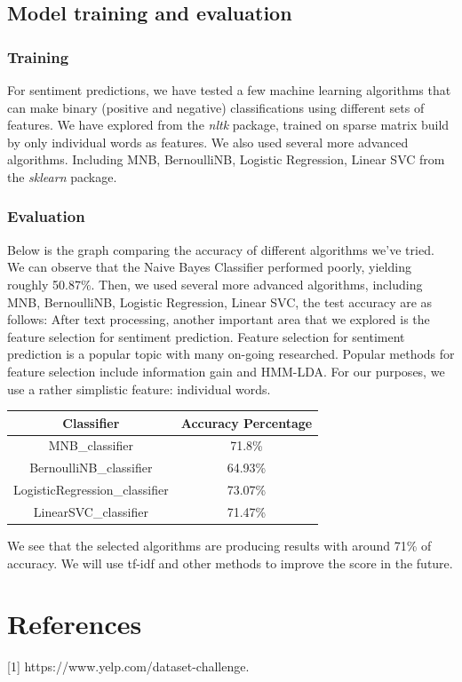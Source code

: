 \documentclass{article}
\begin{document}
\subsection{Model training and evaluation}
\subsubsection{Training}
For sentiment predictions, we have tested a few machine learning algorithms that can make binary (positive and negative) classifications using different sets of features. We have explored from the \textit{nltk} package, trained on sparse matrix build by only individual words as features. We also used several more advanced algorithms. Including MNB, BernoulliNB, Logistic Regression, Linear SVC from the \textit{sklearn} package.

\subsubsection{Evaluation}
Below is the graph comparing the accuracy of different algorithms we've tried.   
We can observe that the Naive Bayes Classifier performed poorly, yielding roughly 50.87\%. 
Then, we used several more advanced algorithms, including MNB, BernoulliNB, Logistic Regression, Linear SVC, the test accuracy are as follows: After text processing, another important area that we explored is the feature selection for sentiment prediction. Feature selection for sentiment prediction is a popular topic with many on-going researched. Popular methods for feature selection include information gain and HMM-LDA. For our purposes, we use a rather simplistic feature: individual words.
\begin{table}[!ht]
\begin{center}
\begin{tabular}{ |c|c| } 
 \hline
Classifier & Accuracy Percentage \\ 
  \hline
 MNB\_classifier & 71.8\% \\ 
  \hline
BernoulliNB\_classifier & 64.93\%\\
  \hline
LogisticRegression\_classifier & 73.07\% \\
  \hline
LinearSVC\_classifier & 71.47\% \\
  \hline
\end{tabular}
\end{center}
\end{table}

We see that the selected algorithms are producing results with around 71\% of accuracy. We will use tf-idf and other methods to improve the score in the future. 

\section*{References}
[1] https://www.yelp.com/dataset-challenge.
\end{document}

